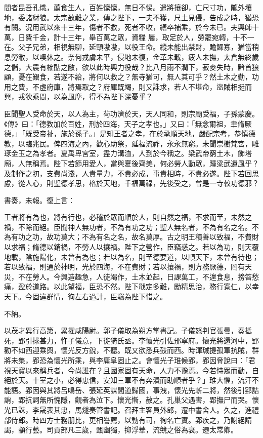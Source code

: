 \begin{pinyinscope}
間者昆吾孔熾，薦食生人，百姓懍懍，無日不惕。遣將攘卻，亡尺寸功，隴外壤地，委諸豺狼。太宗敔難之業，傳之陛下，一夫不獲，尺土見侵，告成之時，猶恐有闕。況用武以來十三年，傷者不救，死者不收，繕卒補乘，於今未已。夫興師十萬，日費千金，計十三年，舉百萬之眾，資糧
 屨，取足於人，勞罷宛轉，十不一在。父子兄弟，相視無聊，延頸嗷嗷，以役王命。縱未能出禁財，贍鰥寡，猶當稍息勞敝，以噢休之。奈何戎虜未平，侵地未復，金革未戢，疲人未撫，太倉無終歲之儲，大農有榷酤之敝，欲以此時興力役哉？比八月雨不潤下，菽麥失時，黔首狼顧，憂在艱食，若遂不給，將何以救之？無寺猶可，無人其可乎？然土木之勤，功用之費，不虛府庫，將焉取之？府庫既竭，則又誅求，若人不堪命，盜賊相挺而興，戎狄乘間，以為風塵，得不為陛下深憂乎？



 臣聞聖人受命於天，以人為主，茍功濟於天，天人同和，則宗廟受福，子孫蒙慶。《傳》曰：「德教加於百姓，刑於四海，天子之孝也。」又曰：「無念爾祖，聿脩厥德，」「既受帝祉，施於孫子。」是知王者之孝，在於承順天地，嚴配宗考，恭慎德教，以臨兆民。俾四海之內，歡心助祭，延福流祚，永永無窮。未聞崇樹梵宮，雕琢金玉之為孝者。夏禹卑宮室，盡力溝洫，人到於今稱之。梁武帝窮土木，飾塔廟，人無稱焉。陛下若節用愛人，當與夏後齊美，何必勞人動眾，踵梁武遺風乎？及制作之初，支費尚淺，人貴量力，不貴必成，事貴相時，不貴必遂。陛下若回思慮，從人心，則聖德孝思，格於天地，千福萬祿，先後受之，曾是一寺較功德邪？



 書奏，未報。復上言：



 王者將有為也，將有行也，必稽於眾而順於人，則自然之福，不求而至，未然之禍，不除而絕。臣聞神人無功者，不為有功之功；聖人無名者，不為有名之名。不為有功之功，故功莫大；不為有名之名，故名莫厚。古之明王積善以致福，不費財以求福；脩德以銷禍，不勞人以攘禍。陛下之營作，臣竊惑之。若以為功，則天覆地載，陰施陽化，未曾有為也；若以為名，則至德要道，以順天下，未曾有待也；若以致福，則通於神明，光於四海，不在費財；若以攘禍，則方務厥德，罔有天災，不在勞人。今興造趣急，人徒竭作，土木並起，日課萬工，不遑食息，搒笞愁痛，盈於道路。以此望福，臣恐不然。陛下戢定多難，勵精思治，務行寬仁，以幸天下。今固違群情，徇左右過計，臣竊為陛下惜之。



 不納。



 以茂才異行高第，累擢咸陽尉。郭子儀取為朔方掌書記。子儀怒判官張曇，奏抵死，郢引捄甚力，忤子儀意，下徙猗氏丞。李懷光引佐邠寧府。懷光將還河中，郢勸不如西迎乘輿，懷光反方銳，不聽。既又欲悉兵鼓而西。時渾瑊提孤軍抗賊，群將未集，郢恐為懷光所乘，與李庸阜固止之。會懷光子琟候郢，郢因脅說曰：「君視天寶以來稱兵者，今尚誰在？且國家固有天命，人力不豫焉。今若恃眾而動，自絕於天。十室之小，必得忠信，安知三軍不有奔潰而助順者乎？」琟大懼，流汗不能語。郢因與其將呂鳴岳、張延英謀間道歸國，事洩，懷光先斬二將，然後引郢詰誚，郢抗詞無所愧隱，觀者為泣下。懷光慚，赦之。孔巢父遇害，郢撫尸而哭。懷光已誅，李晟表其忠，馬燧奏管書記。召拜主客員外郎，遷中書舍人。久之，進禮部侍郎。時四方士務朋比，更相譽薦，以動有司，徇名亡實。郢疾之，乃謝絕請謁，顓行藝。司貢部凡三歲，甄幽獨，抑浮華，流競之俗為衰。遷太常卿。




\end{pinyinscope}
